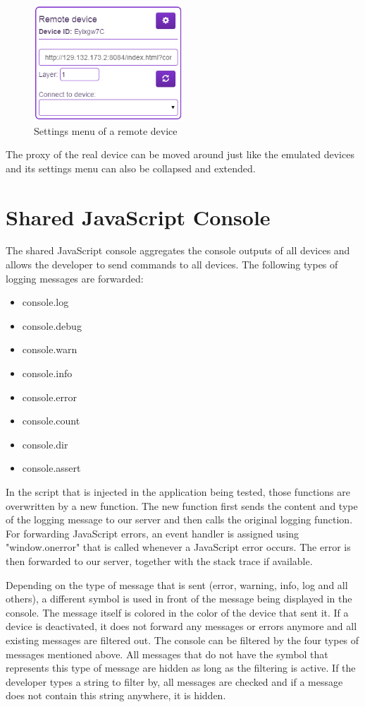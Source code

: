 \begin{figure}[H]
  \centering
    \includegraphics[width=0.5\textwidth]{images/screenshots/remote_device.png}
	\caption{Settings menu of a remote device}
	\label{fig:settings_menu_remote}
\end{figure}

The proxy of the real device can be moved around just like the emulated devices and its settings menu can  also be collapsed and extended.

\section{Shared JavaScript Console}

The shared JavaScript console aggregates the console outputs of all devices and allows the developer to send commands to all devices. The following types of logging messages are forwarded:
\begin{itemize}
	\item console.log
	\item console.debug
	\item console.warn
	\item console.info
	\item console.error
	\item console.count
	\item console.dir
	\item console.assert
\end{itemize}
In the script that is injected in the application being tested, those functions are overwritten by a new function. The new function first sends the content and type of the logging message to our server and then calls the original logging function. For forwarding JavaScript errors, an event handler is assigned using "window.onerror" that is called whenever a JavaScript error occurs. The error is then forwarded to our server, together with the stack trace if available. 

Depending on the type of message that is sent (error, warning, info, log and all others), a different symbol is used in front of the message being displayed in the console. The message itself is colored in the color of the device that sent it. If a device is deactivated, it does not forward any messages or errors anymore and all existing messages are filtered out. The console can be filtered by the four types of messages mentioned above. All messages that do not have the symbol that represents this type of message are hidden as long as the filtering is active. If the developer types a string to filter by, all messages are checked and if a message does not contain this string anywhere, it is hidden.

